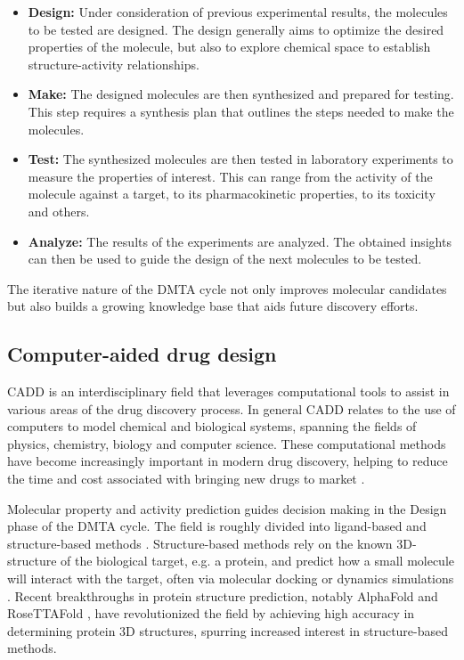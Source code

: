 \begin{itemize}
	\item \textbf{Design:} Under consideration of previous experimental results, the molecules to
	      be tested are designed. The design generally aims to optimize the desired properties of
	      the molecule, but also to explore chemical space to establish structure-activity relationships.
	\item \textbf{Make:} The designed molecules are then synthesized and prepared for testing. This
	      step requires a synthesis plan that outlines the steps needed to make the molecules.
	\item \textbf{Test:} The synthesized molecules are then tested in laboratory experiments to
	      measure the properties of interest. This can range from the activity of the molecule
	      against a target, to its pharmacokinetic properties, to its toxicity and others.
	\item \textbf{Analyze:} The results of the experiments are analyzed. The obtained insights
	      can then be used to guide the design of the next molecules to be tested.
\end{itemize}

The iterative nature of the \ac{DMTA} cycle not only improves molecular candidates but also builds a growing knowledge
base that aids future discovery efforts.

\subsection{Computer-aided drug design}
\Ac{CADD} is an interdisciplinary field that leverages computational tools to assist in various areas of the drug
discovery process. In general \ac{CADD} relates to the use of computers to model chemical and biological systems,
spanning the fields of physics, chemistry, biology and computer science. These computational methods have become
increasingly important in modern drug discovery, helping to reduce the time and cost associated with bringing new drugs
to market
\citep{brownArtificialIntelligenceChemistry2020,niaziComputerAidedDrugDesign2023,sliwoskiComputationalMethodsDrug2014}.

Molecular property and activity prediction guides decision making in the Design phase of the \ac{DMTA} cycle. The
field is roughly divided into ligand-based and structure-based methods \citep{yuComputerAidedDrugDesign2017}.
Structure-based methods rely on the known 3D-structure of the biological target, e.g. a protein, and predict how a small
molecule will interact with the target, often via molecular docking \citep{morrisMolecularDocking2008} or dynamics
simulations \citep{weiStructureDynamicsDrug2024,hospitalMolecularDynamicsSimulations2015}. Recent breakthroughs in
protein structure prediction, notably AlphaFold \citep{jumperHighlyAccurateProtein2021} and RoseTTAFold
\citep{baekAccuratePredictionProtein2021}, have revolutionized the field by achieving high accuracy in
determining protein 3D structures, spurring increased interest in structure-based methods.


